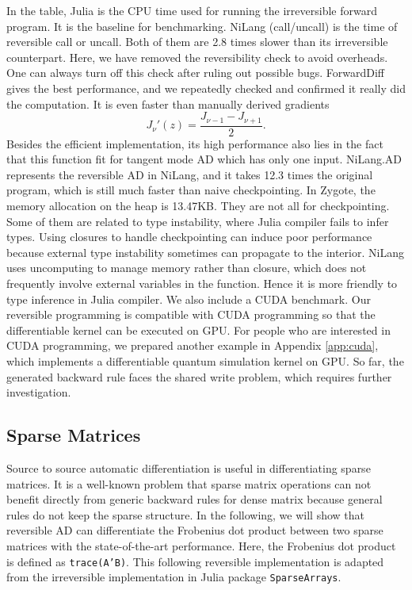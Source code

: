 \documentclass{article}
\newcommand{\<}{\langle}
\renewcommand{\>}{\rangle}
\newcommand{\App}[1]{Appendix \ref{#1}}
\newcommand{\blue}[1]{[{\bf  \color{blue}{JG: #1}}]}
\theoremstyle{definition}\newtheorem{definition}{\textit{Definition}}
\begin{document}
In the table, Julia is the CPU time used for running the irreversible forward program. It is the baseline for benchmarking.
NiLang (call/uncall) is the time of reversible call or uncall. Both of them are 2.8 times slower than its irreversible counterpart. Here, we have removed the reversibility check to avoid overheads. One can always turn off this check after ruling out possible bugs.
ForwardDiff gives the best performance, and we repeatedly checked and confirmed it really did the computation.
It is even faster than manually derived gradients
\begin{equation}
    J_{\nu}'(z) = \frac{J_{\nu-1} - J_{\nu+1}}{2}.
\end{equation}
Besides the efficient implementation, its high performance also lies in the fact that this function fit for tangent mode AD which has only one input.
NiLang.AD represents the reversible AD in NiLang, and it takes 12.3 times the original program, which is still much faster than naive checkpointing.
In Zygote, the memory allocation on the heap is 13.47KB. They are not all for checkpointing. Some of them are related to type instability, where Julia compiler fails to infer types.
Using closures to handle checkpointing can induce poor performance because external type instability sometimes can propagate to the interior.
NiLang uses uncomputing to manage memory rather than closure, which does not frequently involve external variables in the function.
Hence it is more friendly to type inference in Julia compiler.
We also include a CUDA benchmark. Our reversible programming is compatible with CUDA programming so that the differentiable kernel can be executed on GPU.
For people who are interested in CUDA programming, we prepared another example in \App{app:cuda}, which implements a differentiable quantum simulation kernel on GPU.
So far, the generated backward rule faces the shared write problem, which requires further investigation.

\subsection{Sparse Matrices}
Source to source automatic differentiation is useful in differentiating sparse matrices. It is a well-known problem that sparse matrix operations can not benefit directly from generic backward rules for dense matrix because general rules do not keep the sparse structure.
In the following, we will show that reversible AD can differentiate the Frobenius dot product between two sparse matrices with the state-of-the-art performance. Here, the Frobenius dot product is defined as \texttt{trace(A'B)}.
This following reversible implementation is adapted from the irreversible implementation in Julia package \texttt{SparseArrays}.
\end{document}
